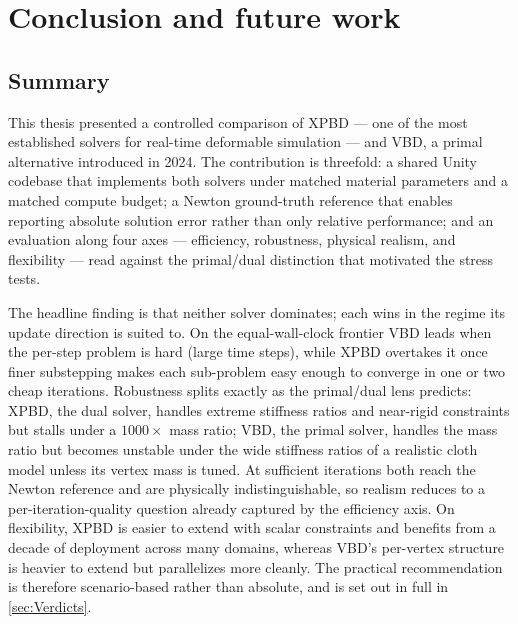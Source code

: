 \chapter{Conclusion and future work}
\label{chap:Conclusion}

\section{Summary}
\label{sec:Summary}
This thesis presented a controlled comparison of XPBD --- one of the most
established solvers for real-time deformable simulation --- and VBD, a primal
alternative introduced in 2024. The contribution is threefold: a shared Unity
codebase that implements both solvers under matched material parameters and a
matched compute budget; a Newton ground-truth reference that enables reporting
absolute solution error rather than only relative performance; and an evaluation
along four axes --- efficiency, robustness, physical realism, and flexibility ---
read against the primal/dual distinction that motivated the stress tests.

The headline finding is that neither solver dominates; each wins in the regime
its update direction is suited to. On the equal-wall-clock frontier VBD leads
when the per-step problem is hard (large time steps), while XPBD overtakes it
once finer substepping makes each sub-problem easy enough to converge in one or
two cheap iterations. Robustness splits exactly as the primal/dual lens predicts:
XPBD, the dual solver, handles extreme stiffness ratios and near-rigid
constraints but stalls under a $1000\times$ mass ratio; VBD, the primal solver,
handles the mass ratio but becomes unstable under the wide stiffness ratios of a
realistic cloth model unless its vertex mass is tuned. At sufficient iterations
both reach the Newton reference and are physically indistinguishable, so realism
reduces to a per-iteration-quality question already captured by the efficiency
axis. On flexibility, XPBD is easier to extend with scalar constraints and
benefits from a decade of deployment across many domains, whereas VBD's
per-vertex structure is heavier to extend but parallelizes more cleanly. The
practical recommendation is therefore scenario-based rather than absolute, and is
set out in full in \autoref{sec:Verdicts}.

